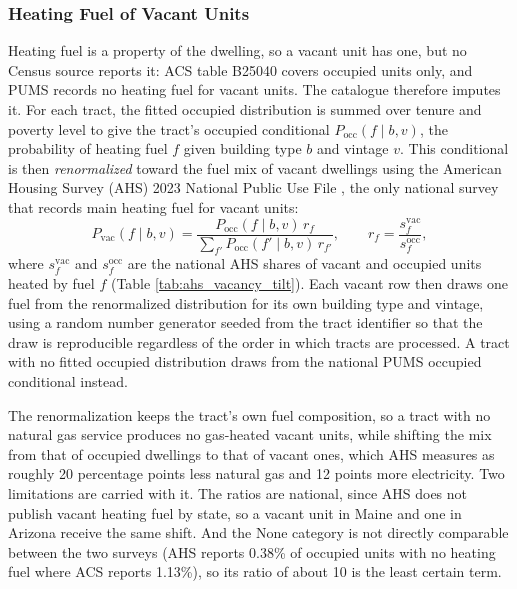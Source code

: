 \subsubsection{Heating Fuel of Vacant Units}\label{sec:vacant_fuel_renormalization}
Heating fuel is a property of the dwelling, so a vacant unit has one, but no Census source reports it: ACS table B25040 covers occupied units only, and PUMS records no heating fuel for vacant units. The catalogue therefore imputes it. For each tract, the fitted occupied distribution is summed over tenure and poverty level to give the tract's occupied conditional $P_{\mathrm{occ}}(f \mid b, v)$, the probability of heating fuel $f$ given building type $b$ and vintage $v$. This conditional is then \textit{renormalized} toward the fuel mix of vacant dwellings using the American Housing Survey (AHS) 2023 National Public Use File \citep{AHS2023}, the only national survey that records main heating fuel for vacant units:
\begin{equation}\label{eq:vacant_fuel_renormalization}
P_{\mathrm{vac}}(f \mid b, v) = \frac{P_{\mathrm{occ}}(f \mid b, v)\, r_f}{\sum_{f'} P_{\mathrm{occ}}(f' \mid b, v)\, r_{f'}}, \qquad r_f = \frac{s^{\mathrm{vac}}_f}{s^{\mathrm{occ}}_f},
\end{equation}
where $s^{\mathrm{vac}}_f$ and $s^{\mathrm{occ}}_f$ are the national AHS shares of vacant and occupied units heated by fuel $f$ (Table \ref{tab:ahs_vacancy_tilt}). Each vacant row then draws one fuel from the renormalized distribution for its own building type and vintage, using a random number generator seeded from the tract identifier so that the draw is reproducible regardless of the order in which tracts are processed. A tract with no fitted occupied distribution draws from the national PUMS occupied conditional instead.

The renormalization keeps the tract's own fuel composition, so a tract with no natural gas service produces no gas-heated vacant units, while shifting the mix from that of occupied dwellings to that of vacant ones, which AHS measures as roughly 20 percentage points less natural gas and 12 points more electricity. Two limitations are carried with it. The ratios are national, since AHS does not publish vacant heating fuel by state, so a vacant unit in Maine and one in Arizona receive the same shift. And the None category is not directly comparable between the two surveys (AHS reports 0.38\% of occupied units with no heating fuel where ACS reports 1.13\%), so its ratio of about 10 is the least certain term.

